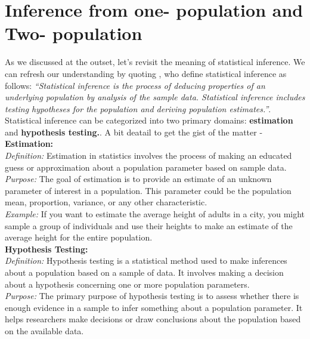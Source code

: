 \documentclass[12pt,a4paper]{article}
\theoremstyle{example}
\theoremstyle{definition}
\theoremstyle{theorem}
\begin{document}
\section{Inference from one- population and Two- population }\label{sec:discussion}
As we discussed at the outset, let's revisit the meaning of statistical inference. We can refresh our understanding by quoting  \citep{casella2021statistical}, who define statistical inference as follows: \textit{“Statistical inference is the process of deducing properties of an underlying population by analysis of the sample data. Statistical inference includes testing hypotheses for the population and deriving population estimates.”}. Statistical inference can be categorized into two primary domains: \textbf{estimation} and \textbf{hypothesis testing.}. A bit deatail to get the gist of the matter -\\

    \textbf{Estimation:}\\
    
            \textit{Definition:} Estimation in statistics involves the process of making an educated guess or approximation about a population parameter based on sample data.\\

           \textit{Purpose:} The goal of estimation is to provide an estimate of an unknown parameter of interest in a population. This parameter could be the population mean, proportion, variance, or any other characteristic.\\

            \textit{Example:} If you want to estimate the average height of adults in a city, you might sample a group of individuals and use their heights to make an estimate of the average height for the entire population.\\
            
    \textbf{Hypothesis Testing:}\\
    
        \textit{Definition:} Hypothesis testing is a statistical method used to make inferences about a population based on a sample of data. It involves making a decision about a hypothesis concerning one or more population parameters.\\
        
        \textit{Purpose:} The primary purpose of hypothesis testing is to assess whether there is enough evidence in a sample to infer something about a population parameter. It helps researchers make decisions or draw conclusions about the population based on the available data.\\
        
\end{document}
